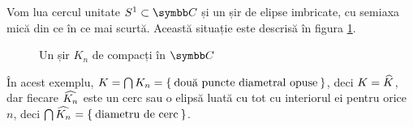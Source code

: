 \begin{solution}
\begin{enumerate}[a)]
    Vom lua cercul unitate \(S^1 \subset \complex\) și un șir de elipse imbricate, cu semiaxa mică din ce în ce mai scurtă. Această situație este descrisă în figura \ref{hw1-pb8}.
    
    \begin{figure}[htbp]
        \centering
        \caption{Un șir \(K_n\) de compacți în \(\complex\)}
        \label{hw1-pb8}
    \end{figure}
    
    În acest exemplu, \(K = \bigcap K_n = \Set{ \text{două puncte diametral opuse} }\), deci \(K = \widehat{K}^{}\), dar fiecare \(\widehat{K_n}^{}\) este un cerc sau o elipsă luată cu tot cu interiorul ei pentru orice \(n\), deci \(\bigcap{\widehat{K_n}^{}} = \Set{ \text{diametru de cerc} }\).
\end{enumerate}
\end{solution}

